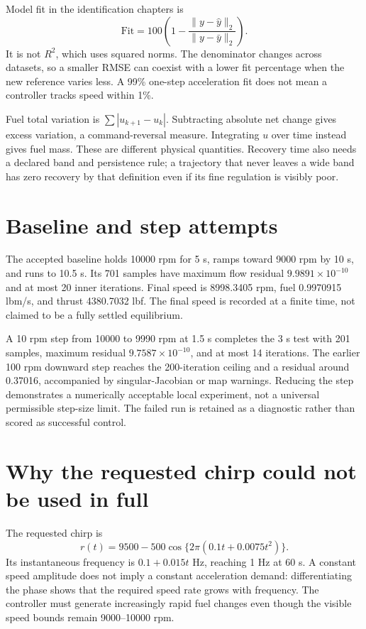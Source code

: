 Model fit in the identification chapters is
\begin{equation}\mathrm{Fit}=100\left(1-\frac{\|y-\hat y\|_2}{\|y-\bar y\|_2}\right).
\end{equation}
It is not $R^2$, which uses squared norms. The denominator changes across datasets, so a smaller RMSE can coexist with a lower fit percentage when the new reference varies less. A 99\% one-step acceleration fit does not mean a controller tracks speed within 1\%.

Fuel total variation is $\sum|u_{k+1}-u_k|$. Subtracting absolute net change gives excess variation, a command-reversal measure. Integrating $u$ over time instead gives fuel mass. These are different physical quantities. Recovery time also needs a declared band and persistence rule; a trajectory that never leaves a wide band has zero recovery by that definition even if its fine regulation is visibly poor.

\section{Baseline and step attempts}
The accepted baseline holds 10000 rpm for 5 s, ramps toward 9000 rpm by 10 s, and runs to 10.5 s. Its 701 samples have maximum flow residual $9.9891\times10^{-10}$ and at most 20 inner iterations. Final speed is 8998.3405 rpm, fuel 0.9970915 lbm/s, and thrust 4380.7032 lbf. The final speed is recorded at a finite time, not claimed to be a fully settled equilibrium.

A 10 rpm step from 10000 to 9990 rpm at 1.5 s completes the 3 s test with 201 samples, maximum residual $9.7587\times10^{-10}$, and at most 14 iterations. The earlier 100 rpm downward step reaches the 200-iteration ceiling and a residual around 0.37016, accompanied by singular-Jacobian or map warnings. Reducing the step demonstrates a numerically acceptable local experiment, not a universal permissible step-size limit. The failed run is retained as a diagnostic rather than scored as successful control.

\section{Why the requested chirp could not be used in full}
The requested chirp is
\begin{equation}r(t)=9500-500\cos\{2\pi(0.1t+0.0075t^2)\}.
\end{equation}
Its instantaneous frequency is $0.1+0.015t$ Hz, reaching 1 Hz at 60 s. A constant speed amplitude does not imply a constant acceleration demand: differentiating the phase shows that the required speed rate grows with frequency. The controller must generate increasingly rapid fuel changes even though the visible speed bounds remain 9000--10000 rpm.

